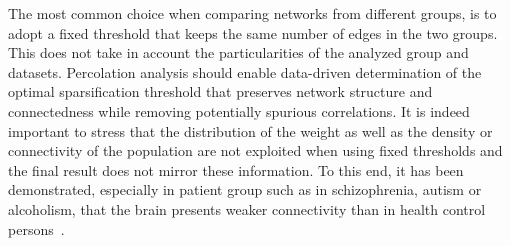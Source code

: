 \documentclass[11pt,              a4paper,              twoside,openright,              titlepage,              headinclude,footinclude,                            numbers=noenddot,              cleardoublepage=empty,]{scrreprt}
\begin{document}
The most common choice when comparing networks from different groups, is to adopt a fixed threshold that keeps the same number of edges in the two groups.
This does not take in account the particularities of the analyzed group and datasets.
Percolation analysis should enable data-driven determination of the optimal sparsification threshold that preserves network structure and connectedness while removing potentially spurious correlations.
It is indeed important to stress that the distribution of the weight as well as the density or connectivity of the population are not exploited when using fixed thresholds and the final result does not mirror these information.
To this end, it has been demonstrated, especially in patient group such as in schizophrenia, autism or alcoholism, that the brain presents weaker connectivity than in health control persons~\cite{alexander-bloch2010}.

 







\end{document}

